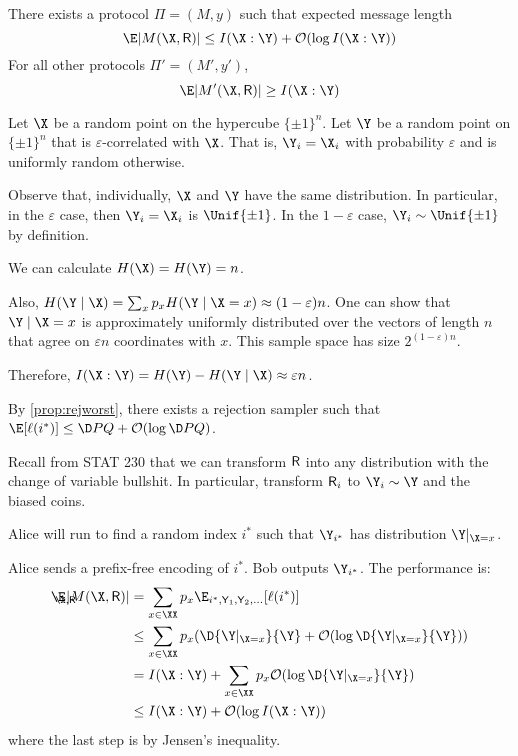 \documentclass[class=co432,notes,tikz]{agony}
\begin{document}
\begin{theorem}
  There exists a protocol $\Pi = (M,y)$ such that expected message length
  \[ \E\abs{M(\X,\rv R)} \leq I(\X : \Y) + \order{\log I(\X : \Y)} \]
  For all other protocols $\Pi' = (M',y')$,
  \[ \E\abs{M'(\X,\rv R)} \geq I(\X : \Y) \]
\end{theorem}
\begin{prf}
  Let $\X$ be a random point on the hypercube $\{\pm1\}^n$.
  Let $\Y$ be a random point on $\{\pm1\}^n$ that is $\varepsilon$-correlated with $\X$.
  That is, $\Y_i = \X_i$ with probability $\varepsilon$
  and is uniformly random otherwise.

  Observe that, individually, $\X$ and $\Y$ have the same distribution.
  In particular, in the $\varepsilon$ case, then $\Y_i = \X_i$ is $\Unif\{\pm1\}$.
  In the $1-\varepsilon$ case, $\Y_i \sim \Unif\{\pm1\}$ by definition.

  We can calculate $H(\X) = H(\Y) = n$.

  Also, $H(\Y\mid\X) = \sum_{x} p_x H(\Y\mid\X=x) \approx (1-\varepsilon)n$.
  One can show that $\Y\mid\X=x$ is approximately uniformly distributed
  over the vectors of length $n$ that agree on $\varepsilon n$ coordinates with $x$.
  This sample space has size $2^{(1-\varepsilon)n}$.

  Therefore, $I(\X:\Y) = H(\Y) - H(\Y \mid \X) \approx \varepsilon n$.

  By \cref{prop:rejworst}, there exists a rejection sampler such that
  $\E[\ell(i^*)] \leq \D P Q + \order{\log \D P Q}$.

  Recall from STAT 230 that we can transform $\mathsf R$ into any distribution
  with the change of variable bullshit.
  In particular, transform $\mathsf R_i$ to \iid $\Y_i \sim \Y$ and the biased coins.

  Alice will run  to find a random index $i^*$
  such that $\Y_{i^*}$ has distribution $\Y|_{\X=x}$.

  Alice sends a prefix-free encoding of $i^*$. Bob outputs $\Y_{i^*}$.
  The performance is:
  \begin{align*}
    \E_{\mathclap{\X,\rv R}} \abs{M(\X,\rv R)}
     & = \sum_{x\in\XX} p_x \E_{i^*,\rv Y_1,\rv Y_2,\dotsc}[\ell(i^*)]                    \\
     & \leq \sum_{x\in\XX} p_x \qty(\D{\Y|_{\X=x}}{\Y} + \order{\log \D{\Y|_{\X=x}}{\Y}}) \\
     & = I(\X:\Y) + \sum_{x\in\XX}p_x\order{\log \D{\Y|_{\X=x}}{\Y}}                      \\
     & \leq I(\X:\Y) + \order{\log I(\X:\Y)}
  \end{align*}
  where the last step is by Jensen's inequality.


\end{prf}
\end{document}

